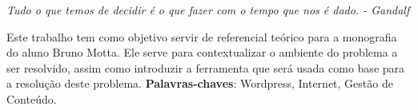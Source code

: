 \documentclass[
	12pt,				%
	openright,			%
	twoside,			%
	a4paper,			%
	Times,
	brazil,				%
	]{abntex2}
\begin{document}
%
%

\begin{epigrafe}
    \vspace*{\fill}
	\begin{flushright}
		\textit{Tudo o que temos de decidir é o que fazer com o tempo que nos é dado. - Gandalf}
	\end{flushright}
\end{epigrafe}


\setlength{\absparsep}{18pt} %
\begin{resumo}
 Este trabalho tem como objetivo servir de referencial teórico para a monografia do aluno Bruno Motta. Ele serve para contextualizar o ambiente do problema a ser resolvido, assim como introduzir a ferramenta que será usada como base para a resolução deste problema.
 \textbf{Palavras-chaves}: Wordpress, Internet, Gestão de Conteúdo.
\end{resumo}
\end{document}
